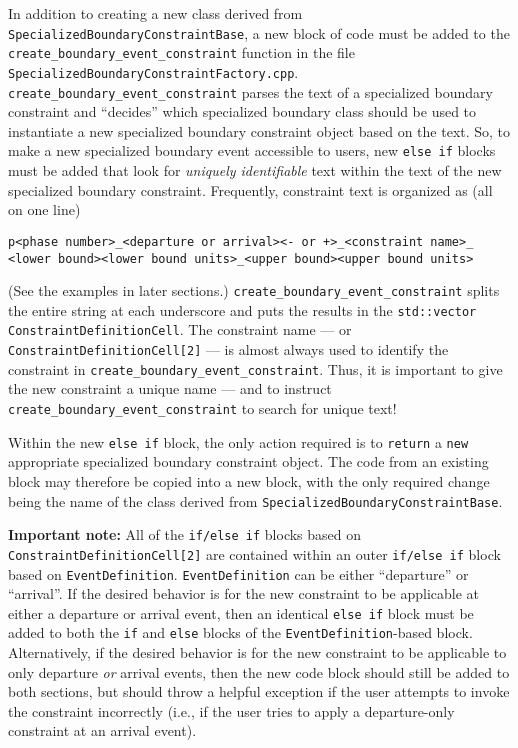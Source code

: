 \documentclass[11pt]{article}
\begin{document}
In addition to creating a new class derived from \texttt{SpecializedBoundaryConstraintBase}, a new block of code must be added to the \texttt{create\_boundary\_event\_constraint} function in the file \texttt{SpecializedBoundaryConstraintFactory.cpp}. \texttt{create\_boundary\_event\_constraint} parses the text of a specialized boundary constraint and ``decides'' which specialized boundary class should be used to instantiate a new specialized boundary constraint object based on the text. So, to make a new specialized boundary event accessible to users, new \texttt{else if} blocks must be added that look for \emph{uniquely identifiable} text within the text of the new specialized boundary constraint. Frequently, constraint text is organized as (all on one line)

\begin{verbatim}
p<phase number>_<departure or arrival><- or +>_<constraint name>_
<lower bound><lower bound units>_<upper bound><upper bound units>
\end{verbatim}

(See the examples in later sections.) \texttt{create\_boundary\_event\_constraint} splits the entire string at each underscore and puts the results in the \texttt{std::vector ConstraintDefinitionCell}. The constraint name --- or \texttt{ConstraintDefinitionCell[2]} --- is almost always used to identify the constraint in \texttt{create\_boundary\_event\_constraint}. Thus, it is important to give the new constraint a unique name --- and to instruct \texttt{create\_boundary\_event\_constraint} to search for unique text!

Within the new \texttt{else if} block, the only action required is to \texttt{return} a \texttt{new} appropriate specialized boundary constraint object. The code from an existing block may therefore be copied into a new block, with the only required change being the name of the class derived from \texttt{SpecializedBoundaryConstraintBase}.

\textbf{Important note:} All of the \texttt{if/else if} blocks based on \texttt{ConstraintDefinitionCell[2]} are contained within an outer \texttt{if/else if} block based on \texttt{EventDefinition}. \texttt{EventDefinition} can be either ``departure'' or ``arrival''. If the desired behavior is for the new constraint to be applicable at either a departure or arrival event, then an identical \texttt{else if} block must be added to both the \texttt{if} and \texttt{else} blocks of the \texttt{EventDefinition}-based block. Alternatively, if the desired behavior is for the new constraint to be applicable to only departure \emph{or} arrival events, then the new code block should still be added to both sections, but should throw a helpful exception if the user attempts to invoke the constraint incorrectly (i.e., if the user tries to apply a departure-only constraint at an arrival event).
\end{document}
